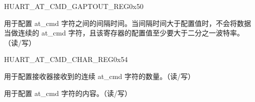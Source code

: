 \begin{register}{H}{UART\_AT\_CMD\_GAPTOUT\_REG}{0x50}\label{regdesc:UARTATCMDGAPTOUTREG}
%
%
\regnewline%
\begin{regdesc}\begin{reglist}
\item [UART\_RX\_GAP\_TOUT]\label{UARTRXGAPTOUT} 用于配置 at\_cmd 字符之间的间隔时间。当间隔时间大于配置值时，不会将数据当做连续的 at\_cmd 字符，且该寄存器的配置值至少要大于二分之一波特率。（读/写）
\end{reglist}\end{regdesc}
\end{register}


\begin{register}{H}{UART\_AT\_CMD\_CHAR\_REG}{0x54}\label{regdesc:UARTATCMDCHARREG}
%
%
%
\regnewline%
\begin{regdesc}\begin{reglist}
\item [UART\_CHAR\_NUM] 用于配置接收器接收到的连续 at\_cmd 字符的数量。（读/写）
\item [UART\_AT\_CMD\_CHAR] 用于配置 at\_cmd 字符的内容。（读/写）
\end{reglist}\end{regdesc}
\end{register}


